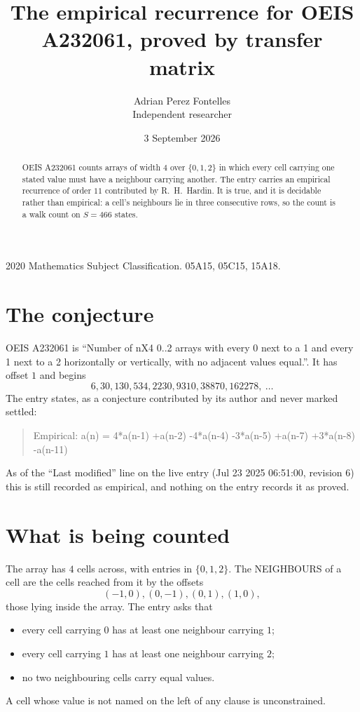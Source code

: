 \documentclass[11pt,a4paper]{article}
\title{The empirical recurrence for OEIS A232061, proved by transfer matrix}
\author{Adrian Perez Fontelles\\ \small Independent researcher}
\date{3 September 2026}
\theoremstyle{plain}
\theoremstyle{definition}
\begin{document}
\maketitle

\begin{abstract}
OEIS A232061 counts arrays of width $4$ over $\{0,1,2\}$ in which every cell carrying one stated
value must have a neighbour carrying another. The entry carries an empirical recurrence of
order $11$ contributed by R.~H.~Hardin. It is true, and it is decidable rather than
empirical: a cell's neighbours lie in three consecutive rows, so the count is a walk count on
$S=466$ states.
\end{abstract}

\noindent\small 2020 Mathematics Subject Classification. 05A15, 05C15, 15A18.\normalsize

\section{The conjecture}

OEIS A232061 is ``Number of nX4 0..2 arrays with every 0 next to a 1 and every 1 next to a 2 horizontally or vertically, with no adjacent values equal.''. It has offset $1$ and begins
\[
6, 30, 130, 534, 2230, 9310, 38870, 162278,\ \dots
\]
The entry states, as a conjecture contributed by its author and never marked settled:
\begin{quote}
Empirical: a(n) = 4*a(n-1) +a(n-2) -4*a(n-4) -3*a(n-5) +a(n-7) +3*a(n-8) -a(n-11)
\end{quote}
As of the ``Last modified'' line on the live entry (Jul 23 2025 06:51:00, revision 6) this is still
recorded as empirical, and nothing on the entry records it as proved.

\section{What is being counted}

The array has $4$ cells across, with entries in $\{0,1,2\}$. The NEIGHBOURS of a cell are the
cells reached from it by the offsets
\[
(-1,0), (0,-1), (0,1), (1,0),
\]
those lying inside the array. The entry asks that
\begin{itemize}
\item every cell carrying $0$ has at least one neighbour carrying $1$;
\item every cell carrying $1$ has at least one neighbour carrying $2$;
\item no two neighbouring cells carry equal values.
\end{itemize}
A cell whose value is not named on the left of any clause is unconstrained.
\end{document}
